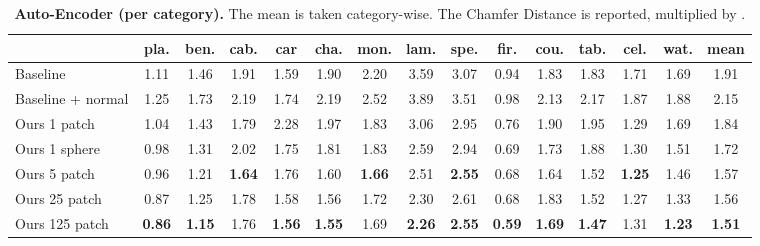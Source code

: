 \documentclass[10pt,twocolumn,letterpaper]{article}
\begin{document}
\vspace*{-8pt}
\begin{table*}
\centering
{
\small
  \begin{tabular}{l|c|c|c|c|c|c|c|c|c|c|c|c|c|c}
   &  pla. &  ben. &  cab. &  car &  cha. &  mon. &  lam. &  spe. &  fir. &  cou. &  tab. &  cel. &  wat. &  mean \\
  \hline
 {Baseline} &  1.11 & 1.46 & 1.91 & 1.59 & 1.90 & 2.20 & 3.59 & 3.07 & 0.94 & 1.83 & 1.83 & 1.71 & 1.69 & 1.91  \\
 {Baseline +  normal} &  1.25 & 1.73 & 2.19 & 1.74 & 2.19 & 2.52 & 3.89 & 3.51 & 0.98 & 2.13 & 2.17 & 1.87 & 1.88 & 2.15  \\
 {Ours 1 patch} &  1.04 &  1.43 &  1.79 &  2.28 &  1.97 &  1.83 &  3.06 &  2.95 &  0.76 &  1.90 &  1.95 &  1.29 &  1.69 &  1.84 \\
 Ours 1 sphere & 0.98 &  1.31 &  2.02 &  1.75 &  1.81 &  1.83 &  2.59 &  2.94 &  0.69 &  1.73 &  1.88 &  1.30 &  1.51 & 1.72 \\
 {Ours 5 patch} &  0.96 &  1.21 &  \textbf{1.64} &  1.76 &  1.60 &  \textbf{1.66} &  2.51 &  \textbf{2.55} &  0.68 &  1.64 &  1.52 &  \textbf{1.25} &  1.46 &  1.57 \\
 {Ours 25 patch} &  0.87 &  1.25 &  1.78 &  1.58 &  1.56 &  1.72 &  2.30 &  2.61 &  0.68 &  1.83 &  1.52 &  1.27 &  1.33 &  1.56 \\
 {Ours 125 patch} &  \textbf{0.86} &  \textbf{1.15} &  1.76 &  \textbf{1.56} &  \textbf{1.55} &  1.69 &  \textbf{2.26} &  \textbf{2.55} &  \textbf{0.59} &  \textbf{1.69} &  \textbf{1.47} &  1.31 &  \textbf{1.23} & \textbf{1.51}\\

\hline
  \end{tabular}

  }
  \caption{\textbf{Auto-Encoder (per category).} The mean is taken category-wise. The Chamfer Distance is reported, multiplied by .
  }
  \label{tab:SVR_AE_chamfer}
\end{table*}
\end{document}
